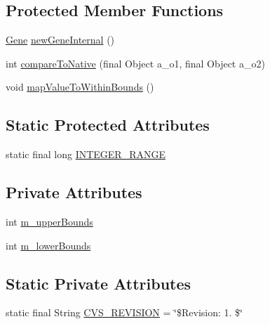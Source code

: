 \subsection*{Protected Member Functions}
\begin{DoxyCompactItemize}
\item 
\hyperlink{interfaceorg_1_1jgap_1_1_gene}{Gene} \hyperlink{classorg_1_1jgap_1_1impl_1_1_integer_gene_a225ed6a7409f890ce21009051eb7392f}{new\-Gene\-Internal} ()
\item 
int \hyperlink{classorg_1_1jgap_1_1impl_1_1_integer_gene_a8bf63bc12293cf330f6aee95d89b644e}{compare\-To\-Native} (final Object a\-\_\-o1, final Object a\-\_\-o2)
\item 
void \hyperlink{classorg_1_1jgap_1_1impl_1_1_integer_gene_ae3c6bf8773b6c13dfe231343be395e0a}{map\-Value\-To\-Within\-Bounds} ()
\end{DoxyCompactItemize}
\subsection*{Static Protected Attributes}
\begin{DoxyCompactItemize}
\item 
static final long \hyperlink{classorg_1_1jgap_1_1impl_1_1_integer_gene_a91bfa275e9a9ba43b6cab6f368aa1526}{I\-N\-T\-E\-G\-E\-R\-\_\-\-R\-A\-N\-G\-E}
\end{DoxyCompactItemize}
\subsection*{Private Attributes}
\begin{DoxyCompactItemize}
\item 
int \hyperlink{classorg_1_1jgap_1_1impl_1_1_integer_gene_a80d01e26893dfaef21fa9223d2e375f4}{m\-\_\-upper\-Bounds}
\item 
int \hyperlink{classorg_1_1jgap_1_1impl_1_1_integer_gene_a71ba6d9ef1c55621d69f0a7fcc00360b}{m\-\_\-lower\-Bounds}
\end{DoxyCompactItemize}
\subsection*{Static Private Attributes}
\begin{DoxyCompactItemize}
\item 
static final String \hyperlink{classorg_1_1jgap_1_1impl_1_1_integer_gene_a55f3d782c94e8002b3e52de15f0e3ae0}{C\-V\-S\-\_\-\-R\-E\-V\-I\-S\-I\-O\-N} = \char`\"{}\$Revision\-: 1. \$\char`\"{}
\end{DoxyCompactItemize}
